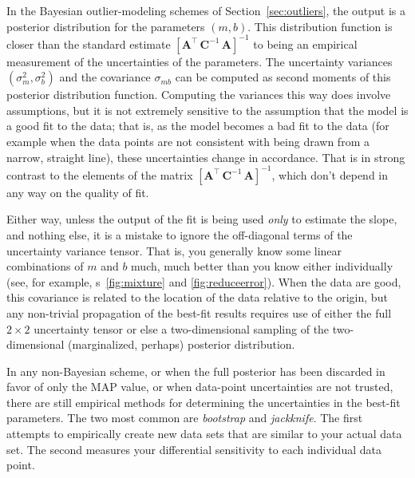 \documentclass[12pt,twoside]{article}
\newcommand{\sectionname}{Section}
\newcommand{\figurenames}{\figurename s}
\newcommand{\mmatrix}[1]{\boldsymbol{#1}}
\newcommand{\inverse}[1]{{#1}^{-1}}
\newcommand{\transpose}[1]{{#1}^{\scriptscriptstyle \top}}
\newcommand{\mA}{\mmatrix{A}}
\newcommand{\mAT}{\transpose{\mA}}
\newcommand{\mC}{\mmatrix{C}}
\newcommand{\mCinv}{\inverse{\mC}}
\begin{document}
In the Bayesian outlier-modeling schemes of
\sectionname~\ref{sec:outliers}, the output is a
posterior distribution for the parameters $(m,b)$.  This distribution
function is closer than the standard estimate
$\inverse{\left[\mAT\,\mCinv\,\mA\right]}$ to being an
empirical measurement of the uncertainties of the parameters.  The
uncertainty variances $(\sigma_m^2,\sigma_b^2)$ and the covariance
$\sigma_{mb}$ can be computed as second moments of this posterior
distribution function.  Computing the variances this way does involve
assumptions, but it is not extremely sensitive to the assumption that
the model is a good fit to the data; that is, as the model becomes a
bad fit to the data (for example when the data points are not
consistent with being drawn from a narrow, straight line), these
uncertainties change in accordance.  That is in strong contrast to the
elements of the matrix $\inverse{\left[\mAT\,\mCinv\,\mA\right]}$,
which don't depend in any way on the quality of fit.

Either way, unless the output of the fit is being used \emph{only} to
estimate the slope, and nothing else, it is a mistake to ignore the
off-diagonal terms of the uncertainty variance tensor.  That is, you
generally know some linear combinations of $m$ and $b$ much, much
better than you know either individually (see, for example,
\figurenames~\ref{fig:mixture} and \ref{fig:reduceerror}).  When the
data are good, this covariance is related to the location of the data
relative to the origin, but any non-trivial propagation of the
best-fit results requires use of either the full $2\times 2$
uncertainty tensor or else a two-dimensional sampling of the
two-dimensional (marginalized, perhaps) posterior distribution.

In any non-Bayesian scheme, or when the full posterior has been
discarded in favor of only the MAP value, or when data-point
uncertainties are not trusted, there are still empirical methods for
determining the uncertainties in the best-fit parameters.  The two
most common are \emph{bootstrap} and \emph{jackknife}.  The first
attempts to empirically create new data sets that are similar to your
actual data set.  The second measures your differential sensitivity to
each individual data point.
\end{document}
